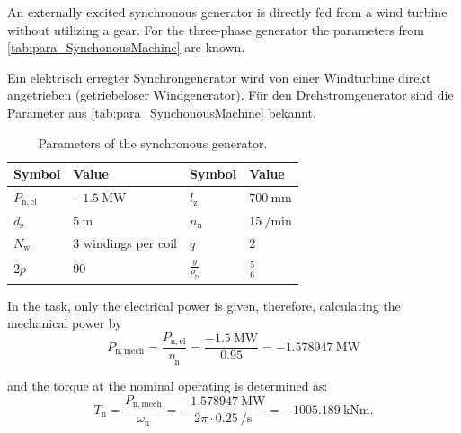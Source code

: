 

An externally excited synchronous generator is directly fed from a wind turbine without utilizing a gear.
For the three-phase generator the parameters from \autoref{tab:para_SynchonousMachine} are known.

\vspace{1em}
\color{gray}
Ein elektrisch erregter Synchrongenerator wird von einer Windturbine direkt angetrieben (getriebeloser Windgenerator). Für den Drehstromgenerator sind die Parameter aus \autoref{tab:para_SynchonousMachine} bekannt.
\color{black}

\begin{table}[htb]
    \caption{Parameters of the synchronous generator.}
    \centering
    \begin{tabular}{llll}\toprule
    Symbol       & Value    & Symbol    & Value \\
    \midrule
    $P_{\mathrm{n,el}}$    & $\SI{-1.5}{\mega\watt}$ & $l_{\mathrm{z}}$   & $\SI{700}{\milli\metre}$ \\
    $d_{\mathrm{s}}$       & $\SI{5}{\metre}$       & $n_{\mathrm{n}}$    & $\SI{15}{\per\minute}$ \\
    $N_{\mathrm{w}}$       & 3 windings per coil    & $q$    & 2 \\
    $2p$                   & 90                     & $\frac{y}{\rho_{\mathrm{p}}}$    & $\frac{5}{6}$ \\
    \bottomrule
    \end{tabular}
    \label{tab:para_SynchonousMachine}
\end{table}
\vspace{-1.3em}

\begin{solutionblock}
    In the task, only the electrical power is given, therefore, calculating the mechanical power by
    $$ P_{\mathrm{n,mech}} = \frac{P_{\mathrm{n,el}}}{\eta_{\mathrm{n}}} = \frac{\SI{-1.5}{\mega\watt}}{0.95} = \SI{-1.578947}{\mega\watt}$$
    
    and the torque at the nominal operating is determined as:
    $$ T_{\mathrm{n}} = \frac{P_{\mathrm{n,mech}}}{\omega_{\mathrm{n}}} = \frac{\SI{-1.578947}{\mega\watt}}{2\pi \cdot \SI{0.25}{\per\second}} = \SI{-1005.189}{\kilo\newton\metre}.$$
\end{solutionblock}

